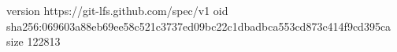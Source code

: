version https://git-lfs.github.com/spec/v1
oid sha256:069603a88eb69ee58c521c3737ed09bc22c1dbadbca553cd873c414f9cd395ca
size 122813
